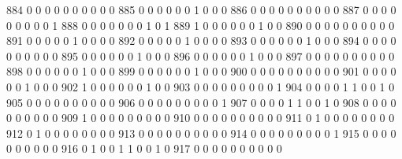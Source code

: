 \documentclass[compress,8pt]{beamer}
\begin{document}
\begin{frame}
\begin{Schunk}
  884      0       0   0              0        0    0       0       0   0   0
  885      0       0   0              0        0    0       1       0   0   0
  886      0       0   0              0        0    0       0       0   0   0
  887      0       0   0              0        0    0       0       0   0   1
  888      0       0   0              0        0    0       0       1   0   1
  889      1       0   0              0        0    0       0       1   0   0
  890      0       0   0              0        0    0       0       0   0   0
  891      0       0   0              0        0    1       0       0   0   0
  892      0       0   0              0        0    1       0       0   0   0
  893      0       0   0              0        0    0       1       0   0   0
  894      0       0   0              0        0    0       0       0   0   0
  895      0       0   0              0        0    0       1       0   0   0
  896      0       0   0              0        0    0       1       0   0   0
  897      0       0   0              0        0    0       0       0   0   0
  898      0       0   0              0        0    0       1       0   0   0
  899      0       0   0              0        0    0       1       0   0   0
  900      0       0   0              0        0    0       0       0   0   0
  901      0       0   0              0        0    0       1       0   0   0
  902      1       0   0              0        0    0       0       1   0   0
  903      0       0   0              0        0    0       0       0   0   1
  904      0       0   0              0        1    1       0       0   1   0
  905      0       0   0              0        0    0       0       0   0   0
  906      0       0   0              0        0    0       0       0   0   1
  907      0       0   0              0        1    1       0       0   1   0
  908      0       0   0              0        0    0       0       0   0   0
  909      1       0   0              0        0    0       0       0   0   0
  910      0       0   0              0        0    0       0       0   0   0
  911      0       1   0              0        0    0       0       0   0   0
  912      0       1   0              0        0    0       0       0   0   0
  913      0       0   0              0        0    0       0       0   0   0
  914      0       0   0              0        0    0       0       0   0   1
  915      0       0   0              0        0    0       0       0   0   0
  916      0       1   0              0        1    1       0       0   1   0
  917      0       0   0              0        0    0       0       0   0   0

\end{Schunk}
\end{frame}
\end{document}
